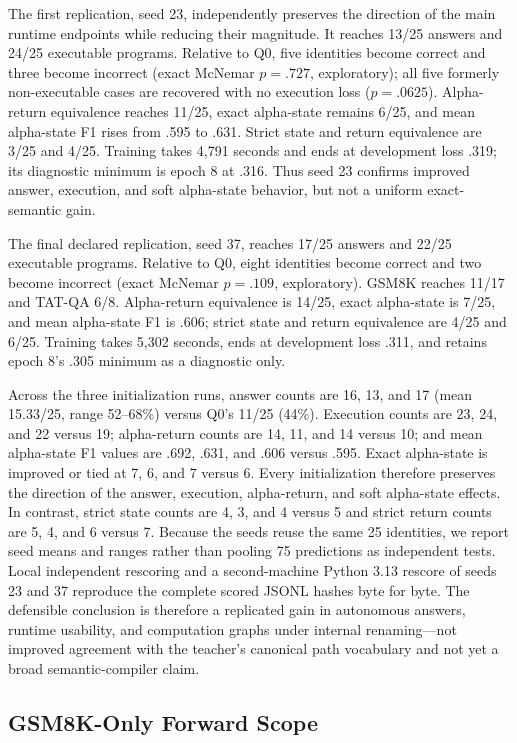 \documentclass[11pt]{article}
\begin{document}
The first replication, seed 23, independently preserves the direction of the
main runtime endpoints while reducing their magnitude. It reaches 13/25 answers
and 24/25 executable programs. Relative to Q0, five identities become correct
and three become incorrect (exact McNemar $p=.727$, exploratory); all five
formerly non-executable cases are recovered with no execution loss
($p=.0625$). Alpha-return equivalence reaches 11/25, exact alpha-state remains
6/25, and mean alpha-state F1 rises from .595 to .631. Strict state and return
equivalence are 3/25 and 4/25. Training takes 4,791 seconds and ends at
development loss .319; its diagnostic minimum is epoch 8 at .316. Thus seed 23
confirms improved answer, execution, and soft alpha-state behavior, but not a
uniform exact-semantic gain.

The final declared replication, seed 37, reaches 17/25 answers and 22/25
executable programs. Relative to Q0, eight identities become correct and two
become incorrect (exact McNemar $p=.109$, exploratory). GSM8K reaches 11/17 and
TAT-QA 6/8. Alpha-return equivalence is 14/25, exact alpha-state is 7/25, and
mean alpha-state F1 is .606; strict state and return equivalence are 4/25 and
6/25. Training takes 5,302 seconds, ends at development loss .311, and retains
epoch 8's .305 minimum as a diagnostic only.

Across the three initialization runs, answer counts are 16, 13, and 17 (mean 15.33/25,
range 52--68\%) versus Q0's 11/25 (44\%). Execution counts are 23, 24, and 22
versus 19; alpha-return counts are 14, 11, and 14 versus 10; and mean
alpha-state F1 values are .692, .631, and .606 versus .595. Exact alpha-state
is improved or tied at 7, 6, and 7 versus 6. Every initialization therefore preserves the
direction of the answer, execution, alpha-return, and soft alpha-state effects.
In contrast, strict state counts are 4, 3, and 4 versus 5 and strict return
counts are 5, 4, and 6 versus 7. Because the seeds reuse the same 25 identities,
we report seed means and ranges rather than pooling 75 predictions as independent
tests. Local independent rescoring and a second-machine Python 3.13 rescore of
seeds 23 and 37 reproduce the complete scored JSONL hashes byte for byte. The
defensible conclusion is therefore a replicated gain in autonomous answers,
runtime usability, and computation graphs under internal renaming---not improved
agreement with the teacher's canonical path vocabulary and not yet a broad
semantic-compiler claim.

\subsection{GSM8K-Only Forward Scope}
\end{document}
